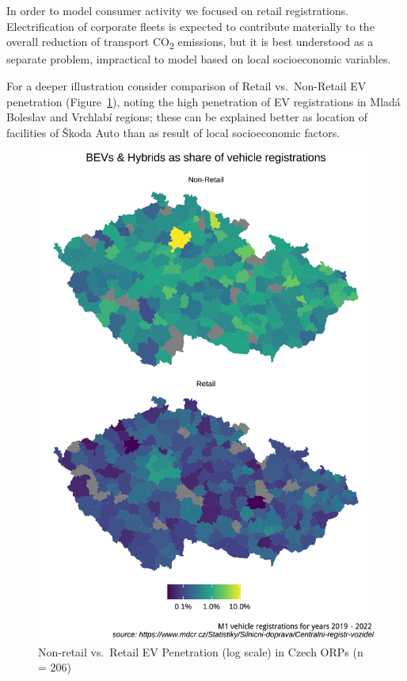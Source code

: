 \documentclass{mmeproc}
\begin{document}
In order to model consumer activity we focused on retail registrations.
Electrification of corporate fleets is expected to contribute materially
to the overall reduction of transport CO\textsubscript{2} emissions, but
it is best understood as a separate problem, impractical to model based
on local socioeconomic variables.

For a deeper illustration consider comparison of Retail vs.~Non-Retail
EV penetration (Figure~\ref{fig-retail-nonretail}), noting the high
penetration of EV registrations in Mladá Boleslav and Vrchlabí regions;
these can be explained better as location of facilities of Škoda Auto
than as result of local socioeconomic factors.

\begin{figure}[H]

{\centering \includegraphics{jla-submission_files/figure-pdf/fig-retail-nonretail-1.pdf}

}

\caption{\label{fig-retail-nonretail}Non-retail vs.~Retail EV
Penetration (log scale) in Czech ORPs (n = 206)}

\end{figure}
\end{document}

